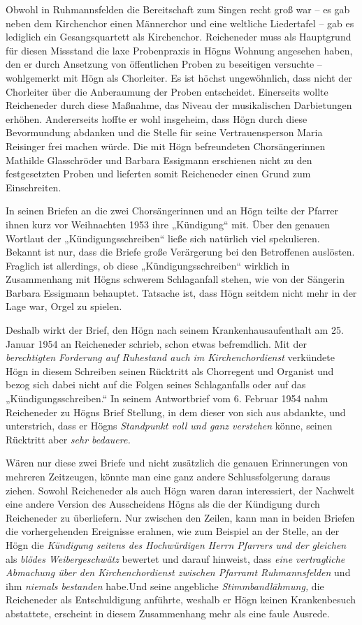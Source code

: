 \documentclass{book}
\newcommand{\zitat}[1]{\textit{#1}}
\begin{document}
Obwohl in Ruhmannsfelden die Bereitschaft zum Singen recht groß war – es
gab neben dem Kirchenchor einen Männerchor und eine weltliche
Liedertafel – gab es lediglich ein Gesangsquartett als Kirchenchor.
Reicheneder muss als Hauptgrund für diesen Missstand die laxe
Probenpraxis in Högns Wohnung angesehen haben, den er durch Ansetzung
von öffentlichen Proben zu beseitigen versuchte – wohlgemerkt mit Högn
als Chorleiter. Es ist höchst ungewöhnlich, dass nicht der Chorleiter
über die Anberaumung der Proben entscheidet. Einerseits wollte
Reicheneder durch diese Maßnahme, das Niveau der musikalischen
Darbietungen erhöhen. Andererseits hoffte er wohl insgeheim, dass
Högn durch diese Bevormundung abdanken und die Stelle für seine
Vertrauensperson Maria Reisinger frei machen würde. Die mit Högn
befreundeten Chorsängerinnen Mathilde Glasschröder und Barbara
Essigmann erschienen nicht zu den festgesetzten Proben und lieferten
somit Reicheneder einen Grund zum Einschreiten.

In seinen Briefen an die zwei Chorsängerinnen und an Högn teilte der
Pfarrer ihnen kurz vor Weihnachten 1953 ihre „Kündigung“ mit. Über den
genauen Wortlaut der „Kündigungsschreiben“ ließe sich natürlich viel
spekulieren. Bekannt ist nur, dass die Briefe große Verärgerung bei den
Betroffenen auslösten. Fraglich ist allerdings, ob diese
„Kündigungsschreiben“ wirklich in Zusammenhang mit Högns schwerem
Schlaganfall stehen, wie von der Sängerin Barbara Essigmann behauptet.
Tatsache ist, dass Högn seitdem nicht mehr in der Lage war, Orgel zu
spielen.

Deshalb wirkt der Brief, den Högn nach seinem Krankenhausaufenthalt am
25. Januar 1954 an Reicheneder schrieb, schon etwas befremdlich. Mit
der \zitat{berechtigten Forderung auf Ruhestand auch im
Kirchenchordienst} verkündete Högn in diesem Schreiben seinen Rücktritt
als Chorregent und Organist und bezog sich dabei nicht auf die Folgen
seines Schlaganfalls oder auf das „Kündigungsschreiben.“ In seinem
Antwortbrief vom 6. Februar 1954 nahm Reicheneder zu Högns Brief
Stellung, in dem dieser von sich aus abdankte, und unterstrich, dass er
Högns \zitat{Standpunkt voll und ganz verstehen} könne,
seinen Rücktritt aber \zitat{sehr bedauere.}

Wären nur diese zwei Briefe und nicht zusätzlich die genauen
Erinnerungen von mehreren Zeitzeugen, könnte man eine ganz andere
Schlussfolgerung daraus ziehen. Sowohl Reicheneder als auch Högn waren
daran interessiert, der Nachwelt eine andere Version des Ausscheidens
Högns als die der Kündigung durch Reicheneder zu überliefern. Nur
zwischen den Zeilen, kann man in beiden Briefen die vorhergehenden
Ereignisse erahnen, wie zum Beispiel an der Stelle, an der Högn die
\zitat{Kündigung seitens des Hochwürdigen Herrn Pfarrers und
der gleichen} als \zitat{blödes Weibergeschwätz} bewertet und
darauf hinweist, dass \zitat{eine vertragliche Abmachung
über den Kirchenchordienst zwischen Pfarramt Ruhmannsfelden} und ihm
 \textit{niemals bestanden} habe.\zitat{\textup{}}Und seine
angebliche \zitat{Stimmbandlähmung,} die Reicheneder als
Entschuldigung anführte, weshalb er Högn keinen Krankenbesuch
abstattete, erscheint in diesem Zusammenhang mehr als eine faule
Ausrede.
\end{document}
